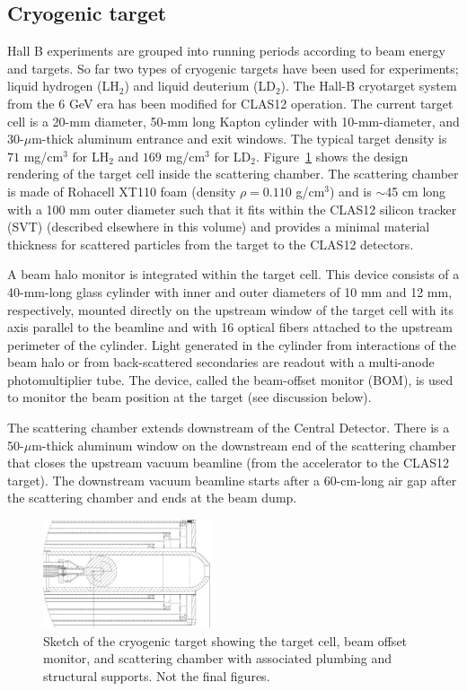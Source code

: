 \subsection{Cryogenic target}
\label{sec-cryotgt}

Hall B experiments are grouped into running periods according to beam energy and targets. So far two types of cryogenic targets have been 
used for experiments; liquid hydrogen (LH$_2$) and liquid deuterium (LD$_2$). The Hall-B cryotarget system from the $6$ GeV era  
\cite{CLAS} has been modified for CLAS12 operation.  The current target cell is a 20-mm diameter, 50-mm long Kapton cylinder
with 10-mm-diameter, and 30-$\mu$m-thick aluminum entrance and exit windows. The typical target density is $71$ mg/cm$^3$ for LH$_2$ 
and $169$ mg/cm$^3$ for LD$_2$. Figure~\ref{fig:targsch} shows the design 
rendering of the target cell inside the scattering chamber.  The scattering chamber is made of Rohacell XT110 foam (density 
$\rho=0.110$ g/cm$^3$) and is $\sim$45 cm long with a 100 mm outer diameter such that it fits within the CLAS12 silicon tracker (SVT) 
(described elsewhere in this volume) and provides a minimal material thickness for scattered particles from the target to the CLAS12 detectors.  

A beam halo monitor is integrated within the target cell. This device consists of a 40-mm-long glass cylinder with inner and outer diameters 
of 10 mm and 12 mm, respectively, mounted directly on the upstream window of the target cell with its axis parallel to the beamline and 
with 16 optical fibers attached to the upstream perimeter of the cylinder. Light generated in the cylinder 
from interactions of the beam halo or from back-scattered secondaries are readout with a multi-anode photomultiplier tube. The device, called 
the  beam-offset monitor (BOM), is used to monitor the beam position at the target (see discussion below).  

The scattering chamber extends downstream of the Central Detector. There is a 50-$\mu$m-thick aluminum window on the downstream end 
of the scattering chamber that closes the upstream vacuum beamline (from the accelerator to the CLAS12 target). The downstream vacuum 
beamline starts after a 60-cm-long air gap after the scattering chamber and ends at the beam dump.  

\begin{figure}[t]
\begin{center}
\includegraphics[width=0.45\textwidth]{target_sch.pdf}
	\caption{Sketch of the cryogenic target showing the target cell, beam offset monitor, and scattering chamber with associated plumbing 
	and structural supports. {\color{red} Not the final figures.}}
\label{fig:targsch}
\end{center}
\end{figure}


